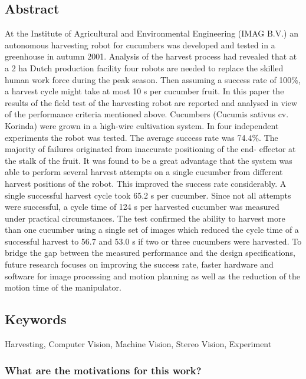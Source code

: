     \subsection*{Abstract}
    At the Institute of Agricultural and Environmental Engineering (IMAG B.V.) an autonomous harvesting
    robot for cucumbers was developed and tested in a greenhouse in autumn 2001. Analysis of the harvest
    process had revealed that at a 2 ha Dutch production facility four robots are needed to replace the skilled
    human work force during the peak season. Then assuming a success rate of 100\%, a harvest cycle might take
    at most 10 s per cucumber fruit. In this paper the results of the field test of the harvesting robot are reported
    and analysed in view of the performance criteria mentioned above. Cucumbers (Cucumis sativus cv. Korinda)
    were grown in a high-wire cultivation system. In four independent experiments the robot was tested. The
    average success rate was 74.4\%. The majority of failures originated from inaccurate positioning of the end-
    effector at the stalk of the fruit. It was found to be a great advantage that the system was able to perform
    several harvest attempts on a single cucumber from different harvest positions of the robot. This improved the
    success rate considerably. A single successful harvest cycle took 65.2 s per cucumber. Since not all attempts
    were successful, a cycle time of 124 s per harvested cucumber was measured under practical circumstances. The
    test confirmed the ability to harvest more than one cucumber using a single set of images which reduced the
    cycle time of a successful harvest to 56.7 and 53.0 s if two or three cucumbers were harvested. To bridge the
    gap between the measured performance and the design specifications, future research focuses on improving the
    success rate, faster hardware and software for image processing and motion planning as well as the reduction
    of the motion time of the manipulator.
    
    
    \subsection*{Keywords} Harvesting, Computer Vision, Machine Vision, Stereo Vision, Experiment
    
     
    \subsubsection*{What are the motivations for this work?}
    
